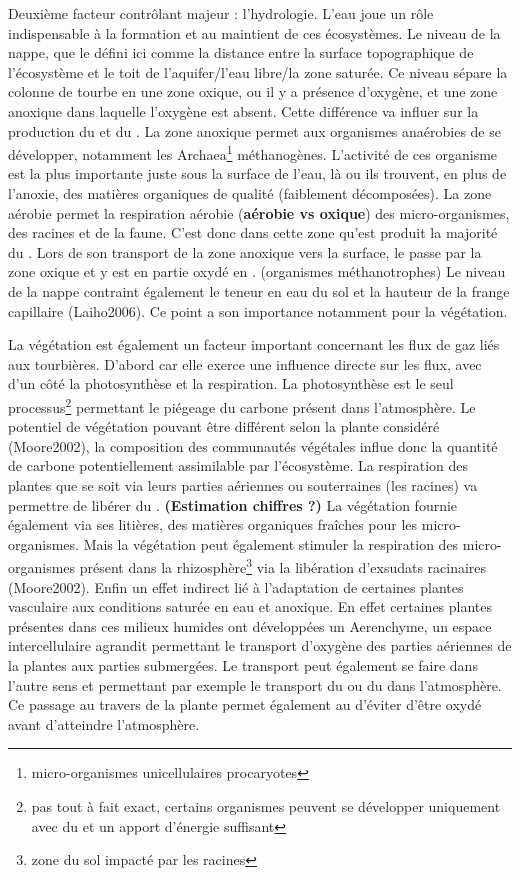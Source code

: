 Deuxième facteur contrôlant majeur : l'hydrologie.
L'eau joue un rôle indispensable à la formation et au maintient de ces écosystèmes.
Le niveau de la nappe, que le défini ici comme la distance entre la surface topographique de l'écosystème et le toit de l'aquifer/l'eau libre/la zone saturée.
Ce niveau sépare la colonne de tourbe en une zone oxique, ou il y a présence d'oxygène, et une zone anoxique dans laquelle l'oxygène est absent.
Cette différence va influer sur la production du \COO et du \CHH.
La zone anoxique permet aux organismes anaérobies de se développer, notamment les Archaea\footnote{micro-organismes unicellulaires procaryotes} méthanogènes.
L'activité de ces organisme est la plus importante juste sous la surface de l'eau, là ou ils trouvent, en plus de l'anoxie, des matières organiques de qualité (faiblement décomposées).
La zone aérobie permet la respiration aérobie (\textbf{aérobie vs oxique}) des micro-organismes, des racines et de la faune.
C'est donc dans cette zone qu'est produit la majorité du \COO.
Lors de son transport de la zone anoxique vers la surface, le \CHH passe par la zone oxique et y est en partie oxydé en \COO.
(organismes méthanotrophes)
Le niveau de la nappe contraint également le teneur en eau du sol et la hauteur de la frange capillaire (Laiho2006).
Ce point a son importance notamment pour la végétation.

La végétation est également un facteur important concernant les flux de gaz liés aux tourbières.
D'abord car elle exerce une influence directe sur les flux, avec d'un côté la photosynthèse et la respiration.
La photosynthèse est le seul processus\footnote{pas tout à fait exact, certains organismes peuvent se développer uniquement avec du \COO et un apport d'énergie suffisant} permettant le piégeage du carbone présent dans l'atmosphère.
Le potentiel de végétation pouvant être différent selon la plante considéré (Moore2002), la composition des communautés végétales influe donc la quantité de carbone potentiellement assimilable par l'écosystème.
La respiration des plantes que se soit via leurs parties aériennes ou souterraines (les racines) va permettre de libérer du \COO.
\textbf{(Estimation chiffres ?)}
La végétation fournie également via ses litières, des matières organiques fraîches pour les micro-organismes.
Mais la végétation peut également stimuler la respiration des micro-organismes présent dans la rhizosphère\footnote{zone du sol impacté par les racines} via la libération d'exsudats racinaires (Moore2002).
Enfin un effet indirect lié à l'adaptation de certaines plantes vasculaire aux conditions saturée en eau et anoxique.
En effet certaines plantes présentes dans ces milieux humides ont développées un Aerenchyme, un espace intercellulaire agrandit permettant le transport d'oxygène des parties aériennes de la plantes aux parties submergées.
Le transport peut également se faire dans l'autre sens et permettant par exemple le transport du \COO ou du \CHH dans l'atmosphère.
Ce passage au travers de la plante permet également au \CHH d'éviter d'être oxydé avant d'atteindre l'atmosphère.



